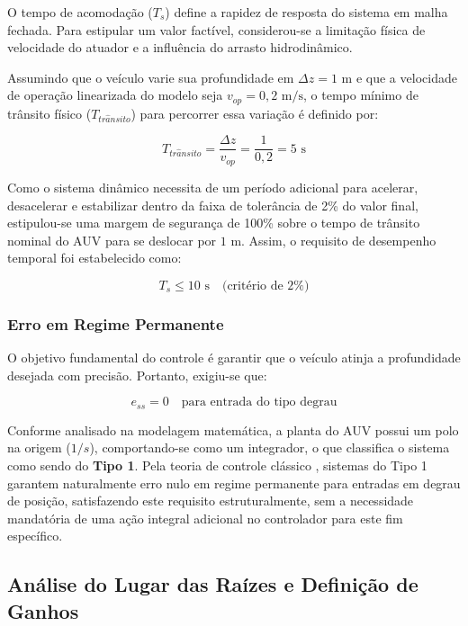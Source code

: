 \documentclass[12pt, a4paper]{article}
\begin{document}
				O tempo de acomodação ($T_s$) define a rapidez de resposta do sistema em malha fechada. Para estipular um valor factível, considerou-se a limitação física de velocidade do atuador e a influência do arrasto hidrodinâmico.

				Assumindo que o veículo varie sua profundidade em $\Delta z = 1 \text{ m}$ e que a velocidade de operação linearizada do modelo seja $v_{op} = 0,2 \text{ m/s}$, o tempo mínimo de trânsito físico ($T_{tr\hat{a}nsito}$) para percorrer essa variação é definido por:

				\begin{equation}
					T_{tr\hat{a}nsito} = \frac{\Delta z}{v_{op}} = \frac{1}{0,2} = 5 \text{ s}
				\end{equation}

				Como o sistema dinâmico necessita de um período adicional para acelerar, desacelerar e estabilizar dentro da faixa de tolerância de 2\% do valor final, estipulou-se uma margem de segurança de 100\% sobre o tempo de trânsito nominal do AUV para se deslocar por $1 \text{ m}$. Assim, o requisito de desempenho temporal foi estabelecido como:

				\begin{equation}
					T_s \le 10 \text{ s} \quad \text{(critério de 2\%)}
				\end{equation}

			\subsubsection{Erro em Regime Permanente}

				O objetivo fundamental do controle é garantir que o veículo atinja a profundidade desejada com precisão. Portanto, exigiu-se que:

				\begin{equation}
					e_{ss} = 0 \quad \text{para entrada do tipo degrau}
				\end{equation}

				Conforme analisado na modelagem matemática, a planta do AUV possui um polo na origem ($1/s$), comportando-se como um integrador, o que classifica o sistema como sendo do \textbf{Tipo 1}. Pela teoria de controle clássico \cite{ogata}, sistemas do Tipo 1 garantem naturalmente erro nulo em regime permanente para entradas em degrau de posição, satisfazendo este requisito estruturalmente, sem a necessidade mandatória de uma ação integral adicional no controlador para este fim específico.

		\subsection{Análise do Lugar das Raízes e Definição de Ganhos}
\end{document}
